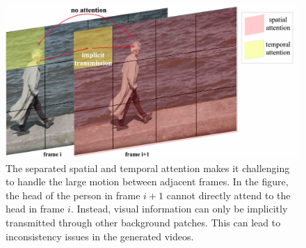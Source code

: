 

\begin{figure}
\centering
\includegraphics[width=\linewidth]{images/attention.jpg}
\caption{The separated spatial and temporal attention makes it challenging to  handle the large motion between adjacent frames. 
In the figure, the head of the person in frame $i+1$ cannot directly attend to the head in frame $i$. 
Instead, visual information can only be implicitly transmitted through other background patches. 
This can lead to inconsistency issues in the generated videos.}
\label{fig:attention}
\end{figure}


